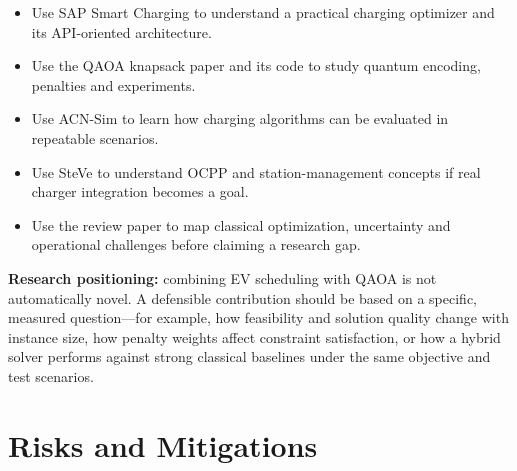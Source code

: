 \documentclass[11pt,a4paper]{article}
\begin{document}
\begin{itemize}
  \item Use SAP Smart Charging to understand a practical charging optimizer and its API-oriented architecture.
  \item Use the QAOA knapsack paper and its code to study quantum encoding, penalties and experiments.
  \item Use ACN-Sim to learn how charging algorithms can be evaluated in repeatable scenarios.
  \item Use SteVe to understand OCPP and station-management concepts if real charger integration becomes a goal.
  \item Use the review paper to map classical optimization, uncertainty and operational challenges before claiming a research gap.
\end{itemize}

\textbf{Research positioning:} combining EV scheduling with QAOA is not automatically novel. A defensible contribution should be based on a specific, measured question—for example, how feasibility and solution quality change with instance size, how penalty weights affect constraint satisfaction, or how a hybrid solver performs against strong classical baselines under the same objective and test scenarios.

\section{Risks and Mitigations}
\end{document}
